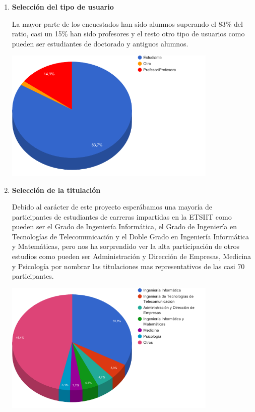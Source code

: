 \begin{enumerate}

  \item \textbf{Selección del tipo de usuario}

  La mayor parte de los encuestados han sido alumnos superando el 83\% del ratio, casi un 15\% han sido profesores y el resto otro tipo de usuarios como pueden  ser estudiantes de doctorado y antiguos alumnos.


	\includegraphics[width=0.8\textwidth]{../charts/01_esusted}


  \item \textbf{Selección de la titulación}

  Debido al carácter de este proyecto esperábamos una mayoría de participantes de estudiantes de carreras impartidas en la ETSIIT como pueden ser el Grado de Ingeniería Informática, el Grado de Ingeniería en Tecnologías de Telecomunicación y el Doble Grado en Ingeniería Informática y Matemáticas, pero nos ha sorprendido ver la alta participación de otros estudios como pueden ser Administración y Dirección de Empresas, Medicina y Psicología por nombrar las titulaciones mas representativos de las casi 70 participantes.

  \includegraphics[width=0.8\textwidth]{../charts/02_titulacion}



\end{enumerate}
